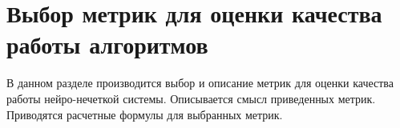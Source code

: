 






\section{Выбор метрик для оценки качества работы алгоритмов}

\begin{annotation}
	В данном разделе производится выбор и описание метрик для оценки
	качества работы нейро-нечеткой системы. Описывается смысл приведенных метрик.
	Приводятся расчетные формулы для выбранных метрик.
\end{annotation}

